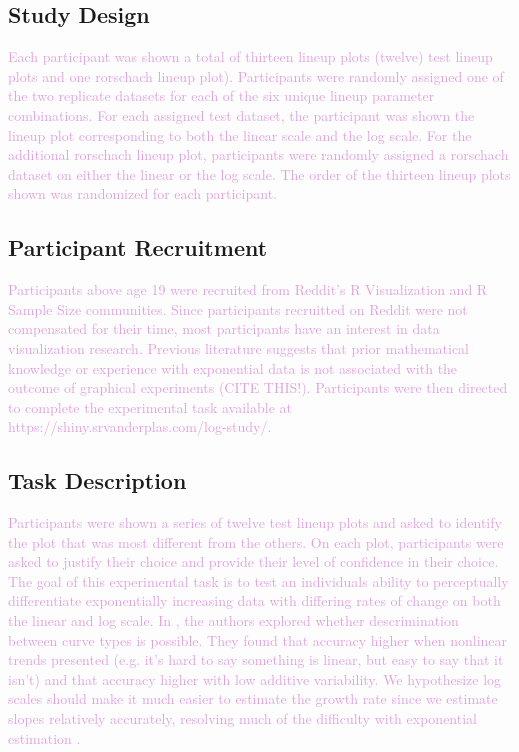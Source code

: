 \documentclass[]{interact}
\theoremstyle{plain}%
\theoremstyle{definition}
\theoremstyle{remark}
\begin{document}
\hypertarget{study-design}{%
\subsection{Study Design}\label{study-design}}

\textcolor{Plum}{
Each participant was shown a total of thirteen lineup plots (twelve) test lineup plots and one rorschach lineup plot). Participants were randomly assigned one of the two replicate datasets for each of the six unique lineup parameter combinations. For each assigned test dataset, the participant was shown the lineup plot corresponding to both the linear scale and the log scale. For the additional rorschach lineup plot, participants were randomly assigned a rorschach dataset on either the linear or the log scale. The order of the thirteen lineup plots shown was randomized for each participant. 
}

\hypertarget{participant-recruitment}{%
\subsection{Participant Recruitment}\label{participant-recruitment}}

\textcolor{Plum}{Participants above age 19 were recruited from Reddit's R Visualization and R Sample Size communities.
Since participants recruitted on Reddit were not compensated for their time, most participants have an interest in data visualization research. 
Previous literature suggests that prior mathematical knowledge or experience with exponential data is not associated with the outcome of graphical experiments (CITE THIS!). 
Participants were then directed to complete the experimental task available at https://shiny.srvanderplas.com/log-study/.
}

\hypertarget{task-description}{%
\subsection{Task Description}\label{task-description}}

\textcolor{Plum}{Participants were shown a series of twelve test lineup plots and asked to identify the plot that was most different from the others. 
On each plot, participants were asked to justify their choice and provide their level of confidence in their choice.
The goal of this experimental task is to test an individuals ability to perceptually differentiate exponentially increasing data with differing rates of change on both the linear and log scale. 
In \cite{best_perception_2007}, the authors explored whether descrimination between curve types is possible. 
They found that accuracy higher when nonlinear trends presented (e.g. it’s hard to say something is linear, but easy to say that it isn’t) and that accuracy higher with low additive variability. We hypothesize log scales should make it much easier to estimate the growth rate since we estimate slopes relatively accurately, resolving much of the difficulty with exponential estimation \citep{mosteller_eye_1981}.
}
\end{document}
